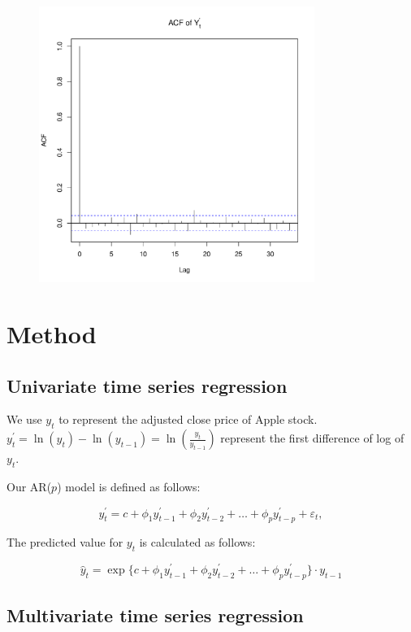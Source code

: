 \documentclass[conference,onecolumn,11pt]{IEEEtran}
\begin{document}
\begin{figure}[htpb]
	\centering
	\includegraphics[width=0.8\textwidth]{pic/ACF_dAdjClosed.pdf}
	\caption{}
	\label{fig:acf2}
\end{figure}



\section{Method}

\subsection*{Univariate time series regression}

We use $y_{t}$ to represent the adjusted close price of Apple stock.
$y^{'}_{t} = \ln(y_{t})-\ln(y_{t-1}) = \ln(\frac{y_{t}}{y_{t-1}})$ represent the first difference of log of $y_{t}$.


Our AR($p$) model is defined as follows:

\[
y^{'}_{t} = c + \phi_{1}y^{'}_{t-1} + \phi_{2}y^{'}_{t-2} + \dots + \phi_{p}y^{'}_{t-p} + \varepsilon_{t},
\]

The predicted value for $y_t$ is calculated as follows:

\[
\hat{y}_t = \exp\{c + \phi_{1}y^{'}_{t-1} + \phi_{2}y^{'}_{t-2} + \dots + \phi_{p}y^{'}_{t-p}\}\cdot y_{t-1}
\]

\subsection*{Multivariate time series regression}
\end{document}
